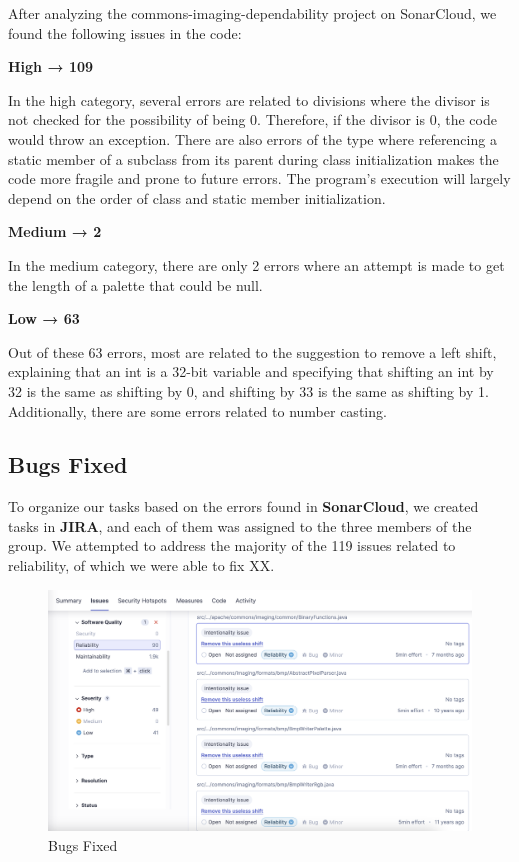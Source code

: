 \documentclass[sigconf]{acmart}
\begin{document}
After analyzing the commons-imaging-dependability project on SonarCloud, we found the following issues in the code:

\textbf{High → 109}

In the high category, several errors are related to divisions where the divisor is not checked for the possibility of being 0. Therefore, if the divisor is 0, the code would throw an exception. There are also errors of the type where referencing a static member of a subclass from its parent during class initialization makes the code more fragile and prone to future errors. The program's execution will largely depend on the order of class and static member initialization.

\textbf{Medium → 2}

In the medium category, there are only 2 errors where an attempt is made to get the length of a palette that could be null.

\textbf{Low → 63}

Out of these 63 errors, most are related to the suggestion to remove a left shift, explaining that an int is a 32-bit variable and specifying that shifting an int by 32 is the same as shifting by 0, and shifting by 33 is the same as shifting by 1. Additionally, there are some errors related to number casting.

\subsection{Bugs Fixed}

To organize our tasks based on the errors found in \textbf{SonarCloud}, we created tasks in \textbf{JIRA}, and each of them was assigned to the three members of the group. We attempted to address the majority of the 119 issues related to reliability, of which we were able to fix XX.

\begin{figure}[h!]
    \centering
    \includegraphics[width=1\linewidth]{reportSonarCloudFixed.png}
    \caption{Bugs Fixed}
    \label{fig:enter-label}
\end{figure}
\end{document}
